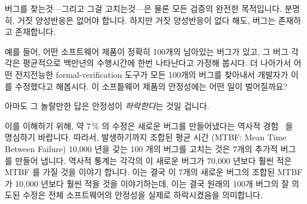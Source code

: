 버그를 찾는것---그리고 그걸 고치는것---은 물론 모든 검증의 완전한 목적입니다.
분명히, 거짓 양성반응은 없어야 합니다.
하지만 거짓 양성반응이 없다 해도, 버그는 존재하고 존재합니다.

예를 들어, 어떤 소프트웨어 제품이 정확히 100개의 남아있는 버그가 있고, 그 버그
각각은 평균적으로 백만년의 수행시간에 한번 나타난다고 가정해 봅시다.
더 나아가서 어떤 전지전능한 formal-verification 도구가 모든 100개의 버그를
찾아내서 개발자가 이를 수정했다고 해봅시다.
이 소프틑웨어 제품의 안정성에는 어떤 일이 벌어질까요?

아마도 그 놀랄만한 답은 안정성이 \emph{하락한다}는 것일 겁니다.
\iffalse

Finding bugs---and fixing them---is of course the whole point of any
type of validation effort.
Clearly, false positives are to be avoided.
But even in the absense of false positives, there are bugs and there are bugs.

For example, suppose that a software artifact had exactly 100 remaining
bugs, each of which manifested on average once every million years
of runtime.
Suppose further that an omniscient formal-verification tool located
all 100 bugs, which the developers duly fixed.
What happens to the reliability of this software artifact?

The perhaps surprising answer is that the reliability \emph{decreases}.
\fi

이를 이해하기 위해, 약 7\,\% 의 수정은 새로운 버그를 만들어냈다는 역사적
경험~\cite{RexBlack2012SQA} 을 명심하기 바랍니다.
따라서, 발생하기까지 조합된 평균 시간 (MTBF: Mean Time Between Failure) 10,000
년을 갖는 100 개의 버그를 고치는 것은 7개의 추가적 버그를 만들어 냅니다.
역사적 통계는 각각의 이 새로운 버그가 70,000 년보다 훨씬 적은 MTBF 를 가질 것을
이야기 합니다.
이는 결국 이 7개의 새로운 버그의 조합된 MTBF 가 10,000 년보다 훨씬 적을 것을
이야기하는데, 이는 결국 원래의 100개 버그의 잘 의도된 수정은 전체 소프트웨어의
안정성을 실제로 하락시켰음을 의미합니다.
\iffalse

To see this, keep in mind that historical experience indicates that
about 7\,\% of fixes introduce a new bug~\cite{RexBlack2012SQA}.
Therefore, fixing the 100 bugs, which had a combined mean time to failure
(MTBF) of about 10,000 years, will introduce seven more bugs.
Historical statistics indicate that each new bug will have an MTBF
much less than 70,000 years.
This in turn suggests that the combined MTBF of these seven new bugs
will most likely be much less than 10,000 years, which in turn means
that the well-intentioned fixing of the original 100 bugs actually
decreased the reliability of the overall software.
\fi

